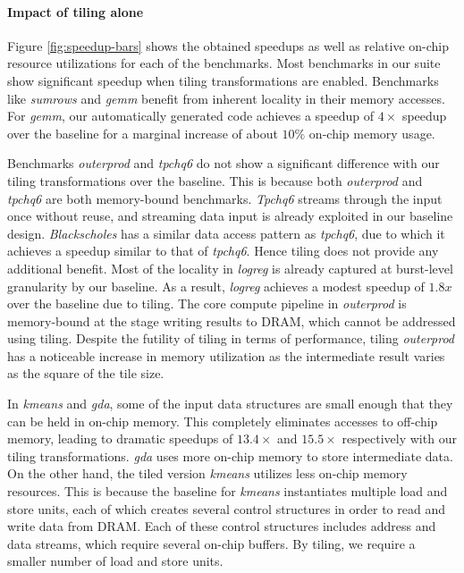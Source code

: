 \paragraph{Impact of tiling alone}
Figure \ref{fig:speedup-bars} shows the obtained speedups as well as relative on-chip resource utilizations for each of the benchmarks.
Most benchmarks in our suite show significant speedup when tiling
transformations are enabled. Benchmarks like \emph{sumrows} and \emph{gemm}
benefit from inherent locality in their memory accesses. For \emph{gemm}, our automatically generated code
achieves a speedup of $4\times$ speedup over the baseline for a marginal increase of about $10\%$ on-chip memory usage.

Benchmarks \emph{outerprod} and \emph{tpchq6} do not
show a significant difference with our tiling transformations over the baseline.
This is because both \emph{outerprod} and
\emph{tpchq6} are both memory-bound benchmarks. \emph{Tpchq6} streams through the input once without reuse, and streaming
data input is already exploited in our baseline design. \emph{Blackscholes} has a similar data access pattern as \emph{tpchq6},
due to which it achieves a speedup similar to that of \emph{tpchq6}. Hence tiling does not provide any additional benefit.
Most of the locality in \emph{logreg} is already captured at burst-level granularity by our baseline. As a result, \emph{logreg}
achieves a modest speedup of $1.8x$ over the baseline due to tiling.
The core compute pipeline in \emph{outerprod} is memory-bound at the stage writing results to DRAM, which cannot be addressed
using tiling. Despite the futility of tiling in terms of performance, tiling \emph{outerprod}
has a noticeable increase in memory utilization as the intermediate result varies as the square of the tile size.

In \emph{kmeans} and \emph{gda}, some
of the input data structures are small enough that they can be held in on-chip memory. This completely
eliminates accesses to off-chip memory, leading to dramatic speedups of $13.4\times$ and $15.5\times$ respectively
with our tiling transformations. \emph{gda} uses more on-chip memory to store intermediate data. On the other hand, the tiled
version \emph{kmeans} utilizes less on-chip memory resources. This is because the baseline for \emph{kmeans} instantiates multiple
load and store units, each of which creates several control structures in order to read and write data from DRAM. Each of these control
structures includes address and data streams, which require several on-chip buffers. By tiling, we require a smaller number of load and store units.

